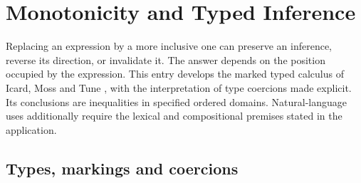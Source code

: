 \chapter{Monotonicity and Typed Inference}
\label{sec:p07-monotonicity-inference}

Replacing an expression by a more inclusive one can preserve an inference,
reverse its direction, or invalidate it. The answer depends on the position
occupied by the expression. This entry develops the marked typed calculus
of Icard, Moss and Tune \cite{IcardMossTune2017Monotonicity}, with the
interpretation of type coercions made explicit. Its conclusions are
inequalities in specified ordered domains. Natural-language uses additionally
require the lexical and compositional premises stated in the application.

\section{Types, markings and coercions}

